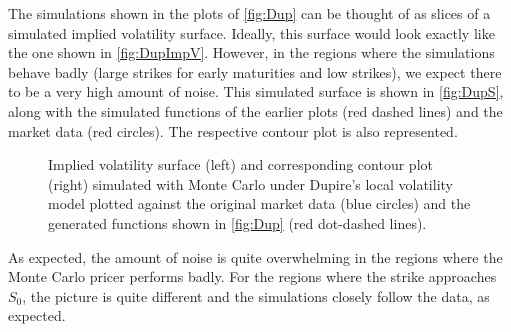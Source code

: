 The simulations shown in the plots of \autoref{fig:Dup} can be thought of as slices of a simulated implied volatility surface. Ideally, this surface would look exactly like the one shown in \autoref{fig:DupImpV}. However, in the regions where the simulations behave badly (large strikes for early maturities and low strikes), we expect there to be a very high amount of noise. This simulated surface is shown in \autoref{fig:DupS}, along with the simulated functions of the earlier plots (red dashed lines) and the market data (red circles). The respective contour plot is also represented.



\begin{figure}[H]
  \begin{subfigmatrix}{2}
  \end{subfigmatrix}
    \caption[Implied volatility surface and corresponding contour plot simulated with Monte Carlo under Dupire's local volatility model plotted against the original market data and the generated functions shown in \autoref{fig:Dup}.]{Implied volatility surface (left) and corresponding contour plot (right) simulated with Monte Carlo under Dupire's local volatility model plotted against the original market data (blue circles) and the generated functions shown in \autoref{fig:Dup} (red dot-dashed lines).}\label{fig:DupS}
\end{figure}   


As expected, the amount of noise is quite overwhelming in the regions where the Monte Carlo pricer performs badly. For the regions where the strike approaches $S_0$, the picture is quite different and the simulations closely follow the data, as expected.

\vspace{\fill}
\newpage

